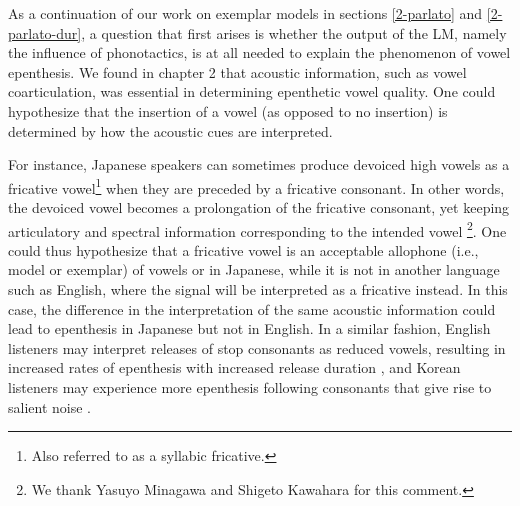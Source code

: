 As a continuation of our work on exemplar models in sections \ref{2-parlato} and \ref{2-parlato-dur}, a question that first arises is whether the output of the LM, namely the influence of phonotactics, is at all needed to explain the phenomenon of vowel epenthesis. We found in chapter 2 that acoustic information, such as vowel coarticulation, was essential in determining epenthetic vowel quality. One could hypothesize that the insertion of a vowel (as opposed to no insertion) is determined by how the acoustic cues are interpreted.

For instance, Japanese speakers can sometimes produce devoiced high vowels as a fricative vowel\footnote{Also referred to as a syllabic fricative.} when they are preceded by a fricative consonant. In other words, the devoiced vowel becomes a prolongation of the fricative consonant, yet keeping articulatory and spectral information corresponding to the intended vowel \cite{matsui2017}\footnote{We thank Yasuyo Minagawa and Shigeto Kawahara for this comment.}. One could thus hypothesize that a fricative vowel is an acceptable allophone (i.e., model or exemplar) of vowels  or  in Japanese, while it is not in another language such as English, where the signal will be interpreted as a fricative instead. In this case, the difference in the interpretation of the same acoustic information could lead to epenthesis in Japanese but not in English. In a similar fashion, English listeners may interpret releases of stop consonants as reduced vowels, resulting in increased rates of epenthesis with increased release duration \cite{wilson2013}, and Korean listeners may experience more epenthesis following consonants that give rise to salient noise \cite{dejong2012}. 

